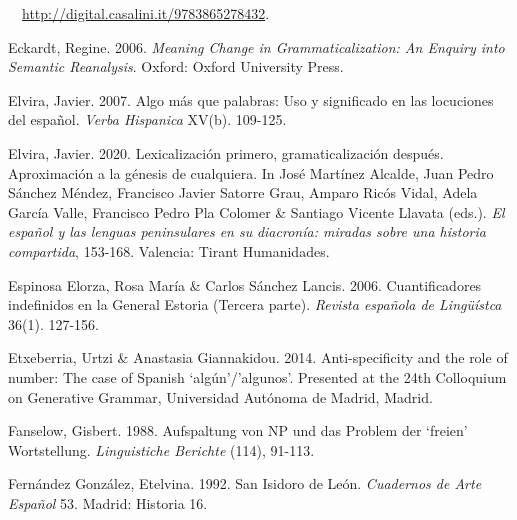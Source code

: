\begin{styleStandard}
\ \ \url{http://digital.casalini.it/9783865278432}.
\end{styleStandard}

\begin{styleStandard}
Eckardt, Regine. 2006. \textit{Meaning Change in Grammaticalization: An Enquiry into Semantic Reanalysis}. Oxford: Oxford University Press.
\end{styleStandard}

\begin{styleStandard}
Elvira, Javier. 2007. Algo más que palabras: Uso y significado en las locuciones del español. \textit{Verba Hispanica} XV(b). 109-125.
\end{styleStandard}

\begin{styleStandard}
Elvira, Javier. 2020. Lexicalización primero, gramaticalización después. Aproximación a la génesis de cualquiera. In José Martínez Alcalde, Juan Pedro Sánchez Méndez, Francisco Javier Satorre Grau, Amparo Ricós Vidal, Adela García Valle, Francisco Pedro Pla Colomer \& Santiago Vicente Llavata (eds.). \textit{El español y las lenguas peninsulares en su }\textit{diacronía: miradas sobre una historia compartida}, 153-168. Valencia: Tirant Humanidades. 
\end{styleStandard}

\begin{styleStandard}
Espinosa Elorza, Rosa María \& Carlos Sánchez Lancis. 2006. Cuantificadores indefinidos en la General Estoria (Tercera parte). \textit{Revista española de Lingüístca} 36(1). 127-156.
\end{styleStandard}

\begin{styleStandard}
Etxeberria, Urtzi \& Anastasia Giannakidou. 2014. Anti-specificity and the role of number: The case of Spanish ‘algún’/’algunos’. Presented at the 24th Colloquium on Generative Grammar, Universidad Autónoma de Madrid, Madrid.
\end{styleStandard}

\begin{styleStandard}
Fanselow, Gisbert. 1988. Aufspaltung von NP und das Problem der ‘freien’ Wortstellung.\textit{ Linguistiche Berichte} (114), 91-113.
\end{styleStandard}

\begin{styleStandard}
Fernández González, Etelvina. 1992. San Isidoro de León. \textit{Cuadernos de Arte Español} 53. Madrid: Historia 16.
\end{styleStandard}


